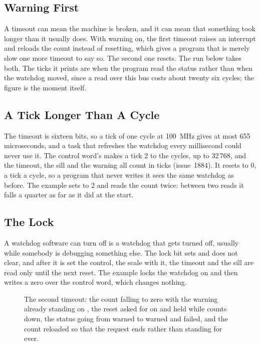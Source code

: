 \subsection{Warning First}

A timeout can mean the machine is broken, and it can mean that
something took longer than it usually does. With warning on, the first
timeout raises an interrupt and reloads the count instead of resetting,
which gives a program that is merely slow one more timeout to say so.
The second one resets. The run below takes both. The ticks it prints
are when the program read the status rather than when the watchdog
moved, since a read over this bus costs about twenty six cycles; the
figure is the moment itself.

\subsection{A Tick Longer Than A Cycle}

The timeout is sixteen bits, so a tick of one cycle at 100~MHz gives
at most 655 microseconds, and a task that refreshes the watchdog every
millisecond could never use it. The control word's  makes
a tick 2 to the  cycles, up to 32\,768, and the timeout,
the sill and the warning all count in ticks (issue~1884). It resets to
0, a tick a cycle, so a program that never writes it sees the same
watchdog as before. The example sets  to 2 and reads the
count twice: between two reads it falls a quarter as far as it did at
the start.

\subsection{The Lock}

A watchdog software can turn off is a watchdog that gets turned off,
usually while somebody is debugging something else. The lock bit sets
and does not clear, and after it is set the control, the scale with
it, the timeout and the sill are read only until the next reset. The example locks the
watchdog on and then writes a zero over the control word, which
changes nothing.

\begin{figure}[htbp]
\centering

\caption{The second timeout: the count falling to zero with the
warning already standing on , the reset asked for on
 and held while  counts down, the status going
from warned to warned and failed, and the count reloaded so that the
request ends rather than standing for ever.}
\label{fig:x-wdog}
\end{figure}





